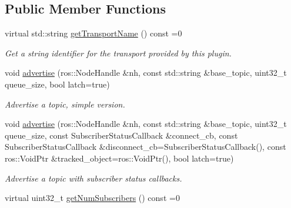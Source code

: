 \subsection*{Public Member Functions}
\begin{DoxyCompactItemize}
\item 
\hypertarget{classimage__transport_1_1_publisher_plugin_abe0cd36dc3c170adb6aec8bc6d81d52e}{virtual std\-::string \hyperlink{classimage__transport_1_1_publisher_plugin_abe0cd36dc3c170adb6aec8bc6d81d52e}{get\-Transport\-Name} () const =0}\label{classimage__transport_1_1_publisher_plugin_abe0cd36dc3c170adb6aec8bc6d81d52e}

\begin{DoxyCompactList}\small\item\em Get a string identifier for the transport provided by this plugin. \end{DoxyCompactList}\item 
\hypertarget{classimage__transport_1_1_publisher_plugin_aa79894b876115d4993fad934e200ad48}{void \hyperlink{classimage__transport_1_1_publisher_plugin_aa79894b876115d4993fad934e200ad48}{advertise} (ros\-::\-Node\-Handle \&nh, const std\-::string \&base\-\_\-topic, uint32\-\_\-t queue\-\_\-size, bool latch=true)}\label{classimage__transport_1_1_publisher_plugin_aa79894b876115d4993fad934e200ad48}

\begin{DoxyCompactList}\small\item\em Advertise a topic, simple version. \end{DoxyCompactList}\item 
\hypertarget{classimage__transport_1_1_publisher_plugin_aa05d1be5ed987a1074b480ef9d6d93ea}{void \hyperlink{classimage__transport_1_1_publisher_plugin_aa05d1be5ed987a1074b480ef9d6d93ea}{advertise} (ros\-::\-Node\-Handle \&nh, const std\-::string \&base\-\_\-topic, uint32\-\_\-t queue\-\_\-size, const Subscriber\-Status\-Callback \&connect\-\_\-cb, const Subscriber\-Status\-Callback \&disconnect\-\_\-cb=Subscriber\-Status\-Callback(), const ros\-::\-Void\-Ptr \&tracked\-\_\-object=ros\-::\-Void\-Ptr(), bool latch=true)}\label{classimage__transport_1_1_publisher_plugin_aa05d1be5ed987a1074b480ef9d6d93ea}

\begin{DoxyCompactList}\small\item\em Advertise a topic with subscriber status callbacks. \end{DoxyCompactList}\item 
\hypertarget{classimage__transport_1_1_publisher_plugin_a10afba12d403ba21536610fce596c856}{virtual uint32\-\_\-t \hyperlink{classimage__transport_1_1_publisher_plugin_a10afba12d403ba21536610fce596c856}{get\-Num\-Subscribers} () const =0}\label{classimage__transport_1_1_publisher_plugin_a10afba12d403ba21536610fce596c856}


\end{DoxyCompactItemize}
